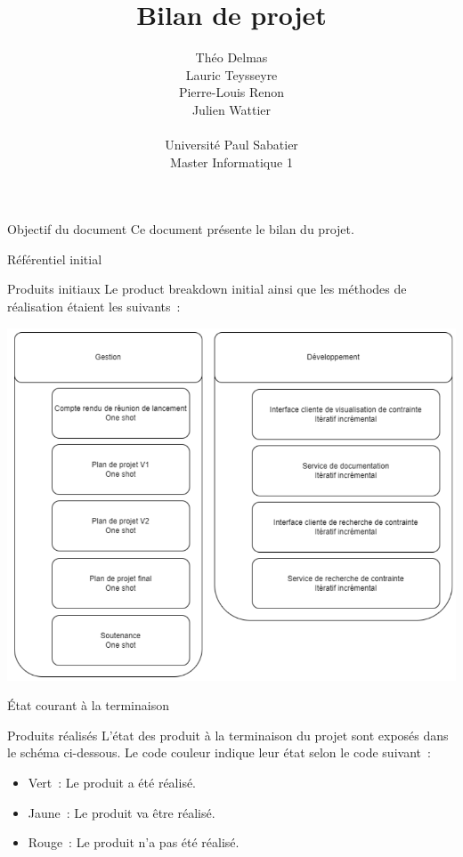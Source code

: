 \documentclass[]{article}
\title{Bilan de projet}
\author{
    Théo Delmas\\
    Lauric Teysseyre\\
    Pierre-Louis Renon\\
    Julien Wattier\\
    \\
    Université Paul Sabatier\\
    Master Informatique 1\\
   }
\begin{document}
\maketitle
\newpage
\tableofcontents
\newpage

\begin{section}{Objectif du document}
 Ce document présente le bilan du projet.
\end{section}

{
\setlength{\parindent}{0pt} %
\begin{section}{Référentiel initial}
 \begin{subsection}{Produits initiaux}
     Le product breakdown initial ainsi que les méthodes de réalisation étaient les suivants :

     \includegraphics[scale=0.6]{IMG/PBS_initial}
 \end{subsection}
\end{section}

\begin{section}{État courant à la terminaison}
 \begin{subsection}{Produits réalisés}
     L’état des produit à la terminaison du projet sont exposés dans le schéma ci-dessous. Le code couleur indique leur état selon le code suivant :

     \begin{itemize}
         \item Vert : Le produit a été réalisé.
         \item Jaune : Le produit va être réalisé.
         \item Rouge : Le produit n’a pas été réalisé.
     \end{itemize}


\end{subsection}
\end{section}}
\end{document}

